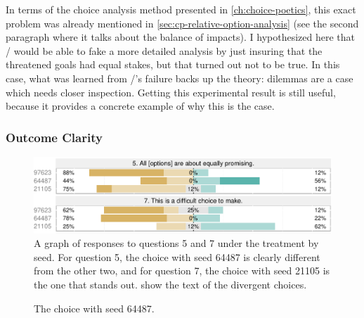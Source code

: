In terms of the choice analysis method presented in \cref{ch:choice-poetics}, this exact problem was already mentioned in \cref{sec:cp-relative-option-analysis} (see the second paragraph where it talks about the balance of impacts).
%
I hypothesized here that \dunyazad/ would be able to fake a more detailed analysis by just insuring that the threatened goals had equal stakes, but that turned out not to be true.
%
In this case, what was learned from \dunyazad/'s failure backs up the theory: dilemmas are a case which needs closer inspection.
%
Getting this experimental result is still useful, because it provides a concrete example of why this is the case.


\subsubsection{Outcome Clarity}


\begin{figure}[!p]
  \includegraphics[width=\textwidth]{fig/obvious-q5-q7.pdf}
  \caption[Prospective balance and difficulty responses for ``obvious'' choices]{A graph of responses to questions 5 and 7 under the \obv{} treatment by seed. For question 5, the choice with seed 64487 is clearly different from the other two, and for question 7, the choice with seed 21105 is the one that stands out.  show the text of the divergent choices.}
  \label{fig:e1-obviousq57}
\end{figure}

\begin{figure}[!p]
\centering
{}
\caption[``Obvious'' choice 64487]{The \obv{} choice with seed 64487.}
  \label{fig:e1-seed-64487}
\end{figure}

